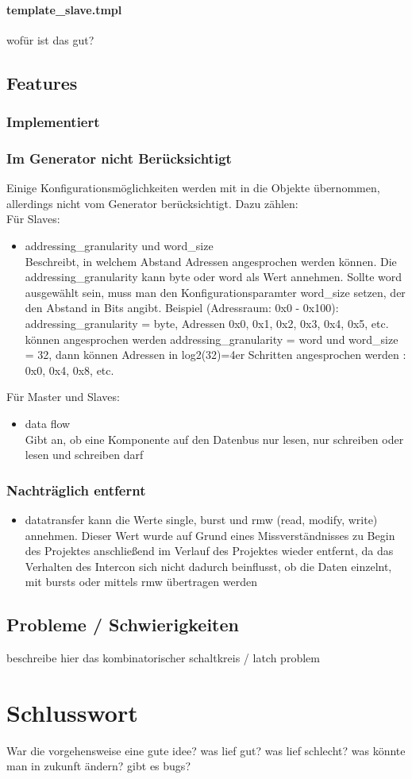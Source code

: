 \documentclass{article}
\begin{document}
\paragraph{template\_slave.tmpl}
wofür ist das gut?
\subsection{Features}
\subsubsection{Implementiert}
\subsubsection{Im Generator nicht Berücksichtigt}
Einige Konfigurationsmöglichkeiten werden mit in die Objekte übernommen, allerdings nicht vom Generator berücksichtigt. Dazu zählen:\\
Für Slaves:
\begin{itemize}
\item addressing\_granularity und word\_size\\
Beschreibt, in welchem Abstand Adressen angesprochen werden können.
Die addressing\_granularity kann byte oder word als Wert annehmen.
Sollte word ausgewählt sein, muss man den Konfigurationsparamter word\_size 
setzen, der den Abstand in Bits angibt. Beispiel (Adressraum: 0x0 - 0x100):\\
addressing\_granularity = byte, Adressen 0x0, 0x1, 0x2, 0x3, 0x4, 0x5, etc. können angesprochen werden
addressing\_granularity = word und word\_size = 32, dann können Adressen in log2(32)=4er Schritten angesprochen werden : 0x0, 0x4, 0x8, etc.
\end{itemize}
Für Master und Slaves:
\begin{itemize}
\item data flow\\
Gibt an, ob eine Komponente auf den Datenbus nur lesen, nur schreiben oder lesen und schreiben darf
\end{itemize}
\subsubsection{Nachträglich entfernt}
\begin{itemize}
\item datatransfer
kann die Werte single, burst und rmw (read, modify, write) annehmen. Dieser Wert wurde auf Grund eines Missverständnisses zu Begin des Projektes anschließend im Verlauf des Projektes wieder entfernt, da das Verhalten des Intercon sich nicht dadurch beinflusst, ob die Daten einzelnt, mit bursts oder mittels rmw übertragen werden
\end{itemize}
\subsection{Probleme / Schwierigkeiten}
beschreibe hier das kombinatorischer schaltkreis / latch problem
\section{Schlusswort}
War die vorgehensweise eine gute idee?
was lief gut?
was lief schlecht?
was könnte man in zukunft ändern?
gibt es bugs?
\end{document}
